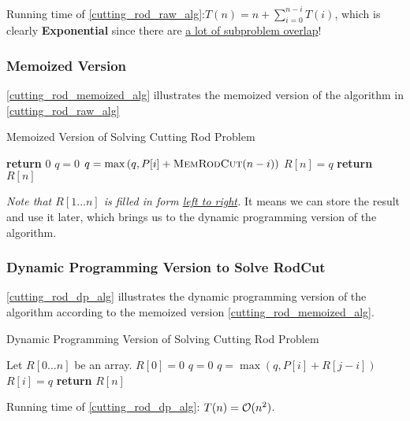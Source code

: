 Running time of \cref{cutting_rod_raw_alg}:$T(n) = n + \sum_{i=0}^{n-i}T(i)$, which is clearly \textbf{Exponential} since there are \underline{a lot of subproblem overlap}!

\subsubsection{Memoized Version}
\cref{cutting_rod_memoized_alg} illustrates the memoized version of the algorithm in \cref{cutting_rod_raw_alg}
\begin{algorithm}[H]
\caption{Memoized Version of Solving Cutting Rod Problem}\label{cutting_rod_memoized_alg}
\begin{algorithmic}[1]
 
    \State \textbf{return} {$0$}
\EndIf
{}
    \State $q=0$
\State $q = \max\left(q, P[i]+\textsc{MemRodCut} (n-i)\right)$
    \EndFor
    \State $R[n] = q$
\EndIf
\State \textbf{return} {$R[n]$}
\EndProcedure
\end{algorithmic}
\end{algorithm}

\emph{Note that $R[1...n]$ is filled in form \underline{left to right}.} It means we can store the result and use it later, which brings us to the dynamic programming version of the algorithm.

\subsubsection{Dynamic Programming Version to Solve RodCut}
\cref{cutting_rod_dp_alg} illustrates the dynamic programming version of the algorithm according to the memoized version \cref{cutting_rod_memoized_alg}.
\begin{algorithm}[H]
\caption{Dynamic Programming Version of Solving Cutting Rod Problem}\label{cutting_rod_dp_alg}
\begin{algorithmic}[1]
\State Let $R[0...n]$ be an array.
\State $R[0] = 0$
    \State $q = 0$
        \State $q = \max(q, P[i] + R[j-i])$
    \EndFor
    \State $R[i] = q$
\EndFor
\State \textbf{return} {$R[n]$}
\EndProcedure
\end{algorithmic}
\end{algorithm}

Running time of \cref{cutting_rod_dp_alg}: $T(n) = \mathcal{O}(n^2)$.

